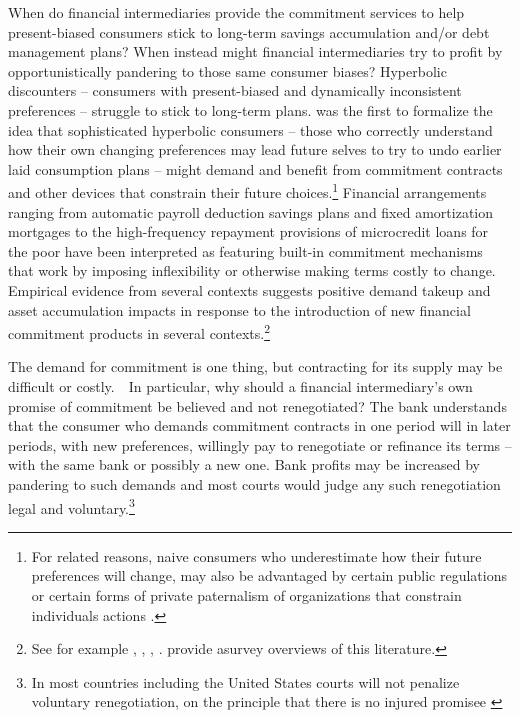 \documentclass[11pt,english]{article}
\theoremstyle{plain}
\theoremstyle{definition}
\begin{document}
When do financial intermediaries provide the commitment services to help present-biased consumers stick to long-term savings accumulation and/or debt management
plans? When instead might financial intermediaries try to profit by opportunistically pandering to those same consumer biases?
Hyperbolic discounters --{} consumers with present-biased \cite{amador2006}
and dynamically inconsistent preferences -- struggle to stick to long-term plans.  \citet{strotz1956} was the first to formalize the idea that sophisticated hyperbolic consumers -- those who correctly understand how their own  changing preferences may lead future selves to try to  undo earlier laid consumption plans -- might demand and benefit from commitment  contracts and other devices that constrain their future choices.\footnote{For related reasons,  naive consumers who underestimate how their future preferences  will change, may also be advantaged by certain public regulations or certain forms of private paternalism of organizations  that constrain individuals  actions \citep{spiegler2011}.}  Financial arrangements ranging from automatic payroll deduction  savings plans and fixed amortization mortgages to the high-frequency repayment
provisions of microcredit loans for the poor
have been interpreted as featuring built-in commitment mechanisms that work by imposing inflexibility or otherwise making terms costly to change. 
 Empirical evidence from several contexts suggests positive demand takeup and asset accumulation impacts in response to the introduction of new financial commitment
products in several contexts.\footnote{See for example  \citet{ariely_procrastination_2002}, \citet{thaler2004}, \citet{ashraf_tying_2006}, \citet{bauer_behavioral_2012}.  \citet{bryan2010} provide asurvey overviews of this literature.}  



The demand for commitment is one thing, but contracting for its supply may be difficult or costly.\ \ In particular, why should a financial intermediary's own promise of commitment  be believed and not renegotiated? The bank understands that the consumer who demands commitment contracts in one period will in later periods, with new preferences,  willingly  pay to renegotiate or refinance its terms -- with the same bank or possibly a new one. Bank
profits may be increased by pandering to such demands and most courts would judge any such renegotiation legal and voluntary.\footnote{In most countries including the United States courts will not penalize voluntary renegotiation, on the principle that there is no injured promisee \citep[see discussion in][p448]{laibson1997}}     
\end{document}
